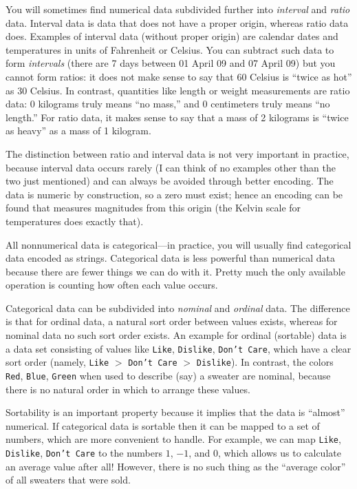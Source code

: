 You will sometimes find numerical data subdivided further into
\emph{interval} and \emph{ratio} data. Interval data is data that does
not have a proper origin, whereas ratio data does. Examples of
interval data (without proper origin) are calendar dates and
temperatures in units of Fahrenheit or Celsius. You can subtract such
data to form \emph{intervals} (there are 7 days between 01 April 09 and
07 April 09) but you cannot form ratios: it does not make sense to say
that 60 Celsius is ``twice as hot'' as 30 Celsius.  In contrast,
quantities like length or weight measurements are ratio data: 0
kilograms truly means ``no mass,'' and 0 centimeters truly means ``no
length.''  For ratio data, it makes sense to say that a mass of 2
kilograms is ``twice as heavy'' as a mass of 1 kilogram.


The distinction between ratio and interval data is not very important
in practice, because interval data occurs rarely (I can think of no
examples other than the two just  mentioned) and can always be
avoided through better encoding. The data is numeric by construction,
so a zero must exist; hence an encoding can be found that measures
magnitudes from this origin (the Kelvin scale for temperatures does
exactly that).

All nonnumerical data is categorical---in practice, you will usually 
find categorical data encoded as strings.  Categorical data is less
powerful than numerical data because there are fewer things we can do
with it. Pretty much the only available operation is counting how
often each value occurs.

Categorical data can be subdivided into \emph{nominal}  and
\emph{ordinal} data.  The difference is that for ordinal data, a
natural sort order\vadjust{\pagebreak} between values exists, whereas for nominal data no
such sort order exists. An example for ordinal (sortable) data is a
data set consisting of values like \texttt{Like}, \texttt{Dislike},
\texttt{Don't Care}, which have a clear sort order (namely,
\texttt{Like} $>$ \texttt{Don't Care} $>$ \texttt{Dislike}). In
contrast, the colors \texttt{Red}, \texttt{Blue}, \texttt{Green} when
used to describe (say) a sweater are nominal, because there is no
natural order in which to arrange these values.

Sortability is an important property because it implies that the data
is ``almost'' numerical.  If categorical data is sortable then it can
be mapped to a set of numbers, which are more convenient to handle.
For example, we can map \texttt{Like}, \texttt{Dislike}, \texttt{Don't
  Care} to the numbers $1$, $-1$, and $0$, which allows us to
calculate an average value after all! However, there is no such thing
as the ``average color'' of all sweaters that were sold.

